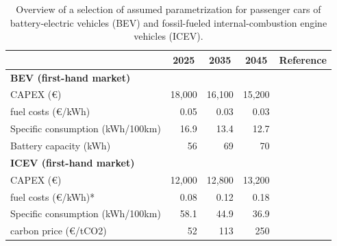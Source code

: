 \documentclass[preprint,review,11pt, authoryear]{elsarticle}
\begin{document}
\begin{table}[]
\centering
\caption{Overview of a selection of assumed parametrization for passenger cars of battery-electric vehicles (BEV) and fossil-fueled internal-combustion engine vehicles (ICEV).}
\label{tab:assumptions_cost}
\begin{tabular}{@{}lrrrl@{}}
 \toprule
                                         & \multicolumn{1}{c}{2025} & \multicolumn{1}{c}{2035} & \multicolumn{1}{c}{2045} & Reference \\ \midrule
\multicolumn{5}{l}{\textbf{BEV (first-hand market)}}                                                                                  \\ \midrule
CAPEX (\euro)                                & 18,000                   & 16,100                   & 15,200                   &   \citep{GRUBE2021103110}        \\
fuel costs (\euro/kWh)                       & 0.05                     & 0.03                     & 0.03                     &    \citep{loffler2025european}       \\
Specific consumption (kWh/100km)         & 16.9                     & 13.4                     & 12.7                     &      \citep{GRUBE2021103110}     \\
Battery capacity (kWh)                   & 56                       & 69                       & 70                       &      \citep{GRUBE2021103110}     \\ \midrule
\multicolumn{5}{l}{\textbf{ICEV (first-hand market)}}                                                                                 \\ \midrule
CAPEX (\euro)                                & 12,000                   & 12,800                   & 13,200                   &   \citep{GRUBE2021103110}        \\
fuel costs (\euro/kWh)*                      & 0.08                     & 0.12                     & 0.18                     &      \citep{GRUBE2021103110}     \\
Specific consumption (kWh/100km)         & 58.1                     & 44.9                     & 36.9                     &      \citep{GRUBE2021103110}     \\
carbon price (\euro/tCO2) & 52                       & 113                      & 250                      &     \citep{loffler2017designing}      \\ \midrule

\end{tabular}
\end{table}
\end{document}
